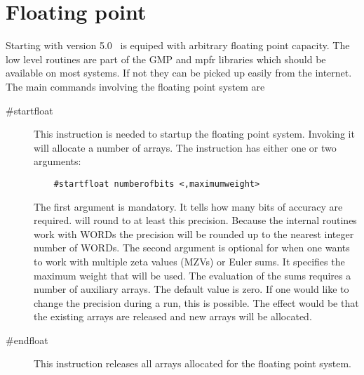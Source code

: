 
\chapter{Floating point}
\label{floatingpoint}

Starting with version 5.0 \FORM\ is equiped with arbitrary floating point 
capacity. The low level routines are part of the GMP and mpfr libraries 
which should be available on most systems. If not they can be picked up 
easily from the internet. The main commands involving the floating point 
system are
\begin{description}
\item[\#startfloat] This instruction is needed to startup the floating 
point system. Invoking it will allocate a number of arrays. The instruction 
has either one or two arguments:
\begin{verbatim}
    #startfloat numberofbits <,maximumweight>
\end{verbatim}
The first argument is mandatory. It tells how many bits of accuracy are 
required. \FORM{} will round to at least this precision. Because the internal 
routines work with WORDs the precision will be rounded up to the nearest 
integer number of WORDs. The second argument is optional for when one wants 
to work with multiple zeta values (MZVs) or Euler sums. It specifies the 
maximum weight that will be used. The evaluation of the sums requires a 
number of auxiliary arrays. The default value is zero. If one would like to 
change the precision during a run, this is possible. The effect would be 
that the existing arrays are released and new arrays will be allocated.
\item[\#endfloat] This instruction releases all arrays allocated for the 
floating point system.
\end{description}

